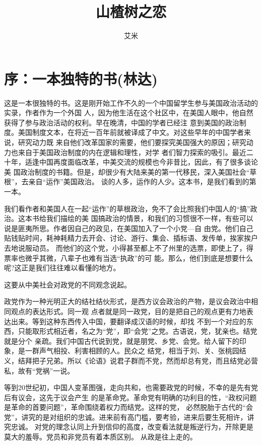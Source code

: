 ﻿\documentclass[11pt]{article}
\title{山楂树之恋}
\author{艾米}
\begin{document}
\cfoot{\textsf{\thepage}}
\tableofcontents

\clearpage
\setcounter{page}{1}
\pagestyle{fancy}

\section{序：一本独特的书(林达)}

这是一本很独特的书。这是刚开始工作不久的一个中国留学生参与美国政治活动的实录，作者作为一个外国
人，因为他生活在这个社区中，在美国人眼中，他自然获得了参与政治活动的权利。早在晚清，中国的学者已经注
意到美国的政治制度。美国制度文本，在将近一百年前就被译成了中文。对这些早年的中国学者来说，研究动力既
来自他们改革国家的需要，他们要探究美国强大的原因；研究动力也来自于美国政治制度的内在逻辑和理性，对学
者们智力探索的吸引。最近二十年，适逢中国再度面临改革，中美交流的规模也今非昔比，因此，有了很多谈论美
国政治制度的书籍。但是，却很少有大陆来美的第一代移民，深入美国社会``草根''，去亲自``运作''美国政治。
谈的人多，运作的人少。这本书，是我们看到的第一本。

我们看作者和美国人在一起``运作''的草根政治，免不了会比照我们中国人的``搞''政治。这本书给我们描绘的美
国搞政治的情景，和我们的习惯很不一样，有些可以说是匪夷所思。作者因自己的政见，在美国加入了一个小党---自
由党。他们自己贴钱贴时间，耗神耗精力去开会、讨论、游行、集会、插标语、发传单，挨家挨户去地说服动员。
而他们的这个党，小得甚至都上不了州里的选票，即使上了，得票率也微乎其微，八辈子也难有当选``执政''的可
能。那么，他们到底是想要什么呢?这正是我们往往难以看懂的地方。

这要从中美社会对政党的不同观念说起。

政党作为一种光明正大的结社结伙形式，是西方议会政治的产物，是议会政治中相同观点的表达形式。同一观
点者就是同一政党，目的是把自己的观点更有力地表达出来。等到这种东西传入中国，要翻译成汉语的时候，却找
不到一个对应的东西，只能取形式相近者，名之为``党''，即``会党''之党。古语说，党，犹亲也。结党就是分个
亲疏。我们中国古代说到党，就是朋党、乡党、会党。给人留下的印象，是一群声气相投、利害相顾的人。民众之
结党，相当于刘、关、张桃园结义，结拜把子兄弟。所以《论语》说君子群而不党，然而却总有党，而且结党必营
私，故有``党祸''一说。

等到20世纪初，中国人变革图强，走向共和，也需要政党的时候，不幸的是先有党后有议会，这先于议会产生
的是革命党。革命党有明确的功利目的性，``政权问题是革命的首要问题''，革命围绕着权力而结党。这样的党，
必然脱胎于古代的``会党''，讲究的是对组织的忠诚。进来前有高门槛，要考验，进来后要生死相许，讲究忠诚。
对党的理念认同上升到信仰的高度，改变看法就是叛逆行为，开除更是莫大的羞辱。党员和非党员有着本质区别。
从政是往上走的。
\end{document}
